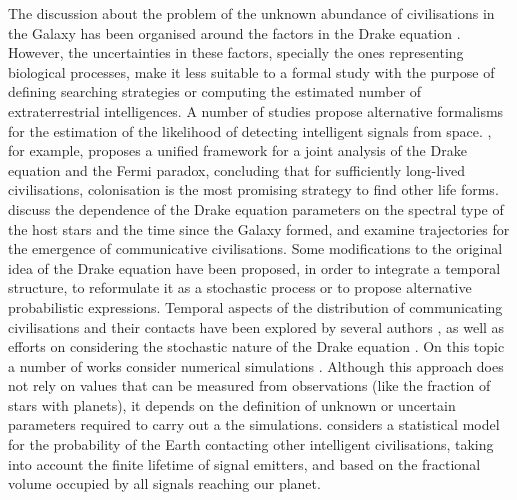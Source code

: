 \documentclass[crop]{CSLB}
\begin{document}
\Fpagebreak


The discussion about the problem of the unknown
abundance of civilisations in the Galaxy has been organised around the
factors in the Drake equation \citep{hinkel_interdisciplinary_2019}.
%
However, the uncertainties in these factors, specially the ones
representing biological processes, make it
less suitable to a formal study with the purpose of defining
searching strategies or
computing the estimated number of extraterrestrial intelligences.
%
A number of studies propose alternative formalisms for the estimation of the
likelihood of detecting intelligent signals from space.
%
\citet{prantzos_joint_2013}, for example, proposes a unified framework for a joint
analysis of the Drake equation and the Fermi paradox, concluding that
for sufficiently long-lived civilisations, colonisation
is the most promising strategy to find other life forms.
%
\citet{haqq-misra_drake_2017} discuss the dependence of the Drake
equation parameters on the spectral type of the host stars and the
time since the Galaxy formed, and examine trajectories for the
emergence of communicative civilisations.
%
Some modifications to the original idea of the Drake equation have
been proposed, in order to
integrate a temporal structure, to
reformulate it as a stochastic process or to propose alternative
probabilistic expressions.
%
Temporal aspects of the distribution of communicating civilisations
and their contacts have been explored by several authors
\citep{fogg_temporal_1987, forgan_spatiotemporal_2011,
balbi_impact_2018, balb_spatiotemporal_2018, horvat_impact_2011}, as
well as efforts on considering the stochastic nature of the Drake
equation \citep{glade_stochastic_2011}.
%
On this topic a number of works consider
numerical simulations \citep{forgan_evaluating_2015,
vukotic_grandeur_2016, murante_simulating_2015, forgan_numerical_2009,
forgan_galactic_2017, ramirez_new_2017}.
%
Although this approach does not rely on values that can be measured
from observations
(like the fraction of stars with planets), 
it depends on the definition of
unknown or uncertain parameters required to carry out
a the simulations.
%
\citet{grimaldi_signal_2017} considers a statistical model for the
probability of the Earth contacting other intelligent civilisations,
taking into account the finite lifetime of signal emitters, and based
on the fractional volume occupied by all signals reaching our planet.
\end{document}
